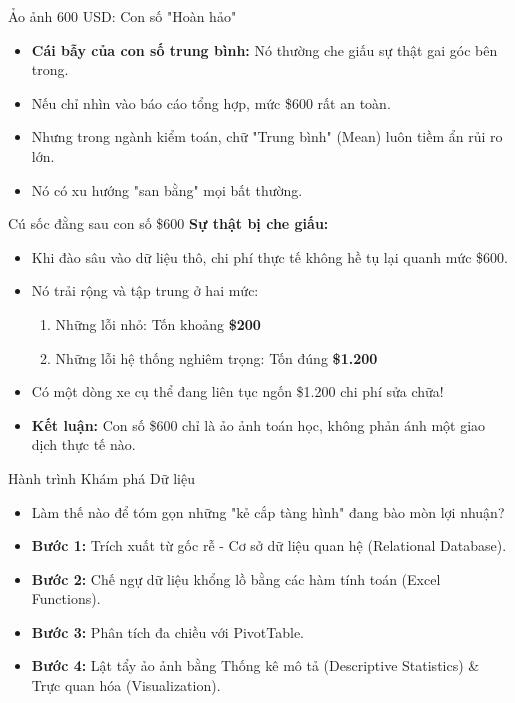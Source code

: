 \documentclass[aspectratio=169,12pt]{beamer}
\begin{document}
\begin{frame}{Ảo ảnh 600 USD: Con số "Hoàn hảo"}
    \begin{itemize}
        \item \textbf{Cái bẫy của con số trung bình:} Nó thường che giấu sự thật gai góc bên trong.
        \item Nếu chỉ nhìn vào báo cáo tổng hợp, mức \$600 rất an toàn.
        \item Nhưng trong ngành kiểm toán, chữ "Trung bình" (Mean) luôn tiềm ẩn rủi ro lớn.
        \item Nó có xu hướng "san bằng" mọi bất thường.
    \end{itemize}
\end{frame}

\begin{frame}{Cú sốc đằng sau con số \$600}
    \textbf{Sự thật bị che giấu:}
    \begin{itemize}
        \item Khi đào sâu vào dữ liệu thô, chi phí thực tế không hề tụ lại quanh mức \$600.
        \item Nó trải rộng và tập trung ở hai mức:
        \begin{enumerate}
            \item Những lỗi nhỏ: Tốn khoảng \textbf{\$200}
            \item Những lỗi hệ thống nghiêm trọng: Tốn đúng \textbf{\$1.200}
        \end{enumerate}
        \item Có một dòng xe cụ thể đang liên tục ngốn \$1.200 chi phí sửa chữa!
        \item \textbf{Kết luận:} Con số \$600 chỉ là ảo ảnh toán học, không phản ánh một giao dịch thực tế nào.
    \end{itemize}
\end{frame}

\begin{frame}{Hành trình Khám phá Dữ liệu}
    \begin{itemize}
        \item Làm thế nào để tóm gọn những "kẻ cắp tàng hình" đang bào mòn lợi nhuận?
        \item \textbf{Bước 1:} Trích xuất từ gốc rễ - Cơ sở dữ liệu quan hệ (Relational Database).
        \item \textbf{Bước 2:} Chế ngự dữ liệu khổng lồ bằng các hàm tính toán (Excel Functions).
        \item \textbf{Bước 3:} Phân tích đa chiều với PivotTable.
        \item \textbf{Bước 4:} Lật tẩy ảo ảnh bằng Thống kê mô tả (Descriptive Statistics) \& Trực quan hóa (Visualization).
    \end{itemize}
\end{frame}
\end{document}
